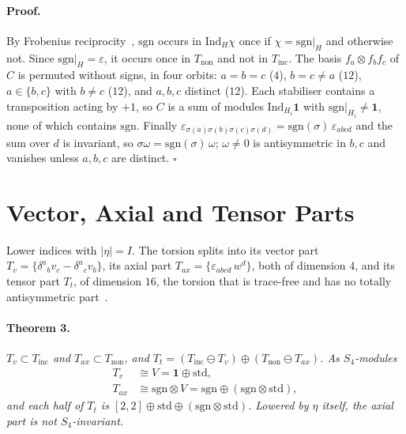 \documentclass[twocolumn]{iopjournal}
\newcommand{\sgn}{\mathrm{sgn}}
\newcommand{\std}{\mathrm{std}}
\newcommand{\Ind}{\mathrm{Ind}}
\begin{document}
\paragraph{Proof.} By Frobenius reciprocity~\cite{Serre}, $\sgn$
occurs in $\Ind_H\chi$ once if $\chi = \sgn|_H$ and otherwise not.
Since $\sgn|_H = \varepsilon$, it occurs once in
$T_{\mathrm{non}}$ and not in $T_{\mathrm{inc}}$. The basis
$f_a \otimes f_b f_c$ of $C$ is permuted without signs, in four
orbits: $a = b = c$ ($4$), $b = c \neq a$ ($12$),
$a \in \{b,c\}$ with $b \neq c$ ($12$), and $a, b, c$ distinct
($12$). Each stabiliser contains a transposition acting by $+1$, so
$C$ is a sum of modules $\Ind_{H_i}\mathbf{1}$ with
$\sgn|_{H_i} \neq \mathbf{1}$, none of which contains $\sgn$.
Finally $\varepsilon_{\sigma(a)\sigma(b)\sigma(c)\sigma(d)} =
\sgn(\sigma)\,\varepsilon_{abcd}$ and the sum over $d$ is
invariant, so $\sigma\omega = \sgn(\sigma)\,\omega$; $\omega \neq 0$
is antisymmetric in $b, c$ and vanishes unless $a, b, c$ are
distinct. \hfill $\square$


\section*{Vector, Axial and Tensor Parts}

Lower indices with $|\eta| = I$. The torsion splits into its vector
part $T_v = \{\delta^a{}_b v_c - \delta^a{}_c v_b\}$, its axial part
$T_{ax} = \{\varepsilon_{abcd}\, w^d\}$, both of dimension $4$, and
its tensor part $T_t$, of dimension $16$, the torsion that is
trace-free and has no totally antisymmetric part~\cite{Hehl1976}.

\paragraph{Theorem 3.} \textit{$T_v \subset T_{\mathrm{inc}}$ and
$T_{ax} \subset T_{\mathrm{non}}$, and
$T_t = (T_{\mathrm{inc}} \ominus T_v) \oplus
(T_{\mathrm{non}} \ominus T_{ax})$. As $S_4$-modules}
\begin{equation}
\begin{aligned}
  T_v &\cong V = \mathbf{1} \oplus \std, \\
  T_{ax} &\cong \sgn \otimes V = \sgn \oplus (\sgn \otimes \std),
\end{aligned}
\end{equation}
\textit{and each half of $T_t$ is
$[2,2] \oplus \std \oplus (\sgn \otimes \std)$. Lowered by $\eta$
itself, the axial part is not $S_4$-invariant.}
\end{document}
